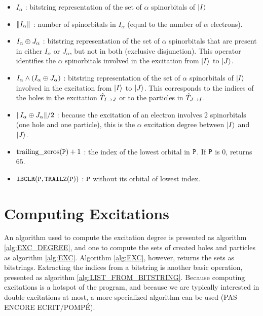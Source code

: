 \documentclass[./thesis.tex]{subfiles}
\begin{document}
\begin{itemize}
	      
	\item $I_{\alpha}$ : bitstring representation of the set of $\alpha$ spinorbitals of ${\ket{I}}$
	            
	\item $\norm{I_{\alpha}}$ : number of spinorbitals in $I_{\alpha}$ (equal to the number of $\alpha$ electrons).
	            
	\item $I_{\alpha} \oplus J_{\alpha}$ : bitstring representation of the set of $\alpha$ spinorbitals that are present in either $I_{\alpha}$ or $J_{\alpha}$, but not in both (exclusive disjunction).
        This operator identifies the $\alpha$ spinorbitals involved in the excitation from ${\ket{I}}$ to ${\ket{J}}$. 
	            
	\item $I_{\alpha} \wedge \qty(I_{\alpha} \oplus J_{\alpha})$ : 
        bitstring representation of the set of $\alpha$ spinorbitals of ${\ket{I}}$ involved in the excitation from ${\ket{I}}$ to ${\ket{J}}$. This corresponds to the indices of the holes in the excitation ${\hat{T}_{I \rightarrow J}}$ or to the particles in ${\hat{T}_{J \rightarrow I}}$. 
	            
	\item $\norm{I_{\alpha} \oplus J_{\alpha}}/2$ : because the excitation of an electron involves 2 spinorbitals (one hole and one particle), this is the $\alpha$ excitation degree between ${\ket{I}}$ and ${\ket{J}}$.
	            
	\item $\text{trailing\_zeros}({\texttt{P}})+1$ : the index of the lowest orbital in ${\texttt{P}}$. If ${\texttt{P}}$ is $0$, returns $65$.
	            
	\item $\text{\texttt{IBCLR}}({\texttt{P}},\text{\texttt{TRAILZ}}({\texttt{P}}))$ : ${\texttt{P}}$ without its orbital of lowest index.

\end{itemize}


\section{Computing Excitations}

An algorithm used to compute the excitation degree is presented as algorithm \ref{alg:EXC_DEGREE}, and one to compute the sets of created holes and particles as algorithm \ref{alg:EXC}. Algorithm \ref{alg:EXC}, however, returns the sets as bitstrings. Extracting the indices from a bitstring is another basic operation, presented as algorithm \ref{alg:LIST_FROM_BITSTRING}.
Because computing excitations is a hotspot of the program, and because we are typically interested in double excitations at most, a more specialized algorithm can be used (\alert{PAS ENCORE ECRIT/POMPÉ}).
\end{document}
